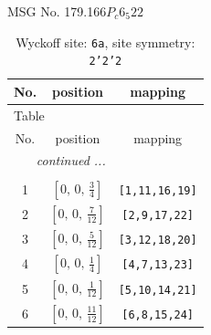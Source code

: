 \documentclass[fleqn,8pt]{jsarticle}
\begin{document}
\setcounter{MaxMatrixCols}{32}

\renewcommand{\tablename}{Table~}
\renewcommand{\figurename}{Figure~}
\begin{center}
\LARGE
MSG No. 179.166\quad$P_{c}6_{5}22$
\end{center}
\renewcommand{\arraystretch}{1.2}
\begin{longtable}{ccc}
\caption{Wyckoff site: {\tt 6a}, site symmetry: {\tt 2'2'2}}
 \\
 \hline \hline
No. & position & mapping \\ \hline \endfirsthead

\multicolumn{2}{l}{\tablename\ \thetable{}} \\
 \hline \hline
No. & position & mapping \\ \hline \endhead

 \hline \hline
\multicolumn{2}{r}{\footnotesize\it continued ...} \\ \endfoot

 \hline \hline
\multicolumn{2}{r}{} \\ \endlastfoot

1 & $\left[ 0,\, 0,\, \frac{3}{4} \right]$ & {\tt [1,11,16,19]} \\ \hline
2 & $\left[ 0,\, 0,\, \frac{7}{12} \right]$ & {\tt [2,9,17,22]} \\ \hline
3 & $\left[ 0,\, 0,\, \frac{5}{12} \right]$ & {\tt [3,12,18,20]} \\ \hline
4 & $\left[ 0,\, 0,\, \frac{1}{4} \right]$ & {\tt [4,7,13,23]} \\ \hline
5 & $\left[ 0,\, 0,\, \frac{1}{12} \right]$ & {\tt [5,10,14,21]} \\ \hline
6 & $\left[ 0,\, 0,\, \frac{11}{12} \right]$ & {\tt [6,8,15,24]} \\
\end{longtable}
\renewcommand{\arraystretch}{1.2}
\end{document}
